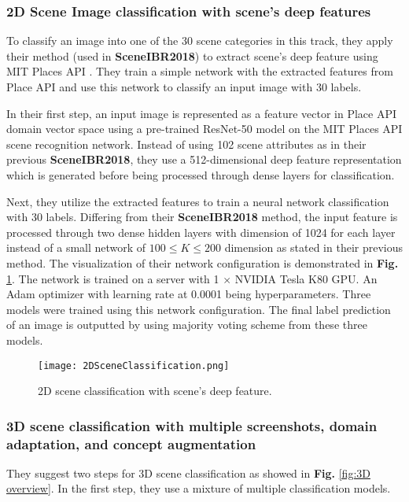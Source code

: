 \documentclass[../main.tex]{subfiles}
\begin{document}
	\subsubsection{2D Scene Image classification with scene's deep features}
	
	To classify an image into one of the 30 scene categories in this track, they apply their method (used in \textbf{SceneIBR2018}) to extract scene's deep feature using MIT Places API \cite{zhou2017places}. They train a simple network with the extracted features from Place API and use this network to classify an input image with 30 labels.
	
	In their first step, an input image is represented as a feature vector in Place API domain vector space using a pre-trained ResNet-50 \cite{resnet} model on the MIT Places API scene recognition network. Instead of using 102 scene attributes as in their previous \textbf{SceneIBR2018}, they use a 512-dimensional deep feature representation which is generated before being processed through dense layers for classification.
	
	Next, they utilize the extracted features to train a neural network classification with 30 labels. Differing from their \textbf{SceneIBR2018} method, the input feature is processed through two dense hidden layers with dimension of 1024 for each layer instead of a small network of $100 \le K \le 200$ dimension as stated in their previous method. The visualization of their network configuration is demonstrated in \textbf{Fig.} \ref{fig:2DSceneClassificationNetwork}. The network is trained on a server with 1 $\times$ NVIDIA Tesla K80 GPU. An Adam optimizer with learning rate at 0.0001 being hyperparameters. Three models were trained using this network configuration. The final label prediction of an image is outputted by using majority voting scheme from these three models.
	
	\begin{figure}[h]
		\texttt{[image: 2DSceneClassification.png]}
		\centering
		\caption{2D scene classification with scene's deep feature.}
		\label{fig:2DSceneClassificationNetwork}
	\end{figure}
	
	
	\subsubsection{3D scene classification with multiple screenshots, domain adaptation, and concept augmentation}
	They suggest two steps for 3D scene classification as showed in \textbf{Fig.} \ref{fig:3D overview}. In the first step, they use a mixture of multiple classification models.
	
\end{document}
